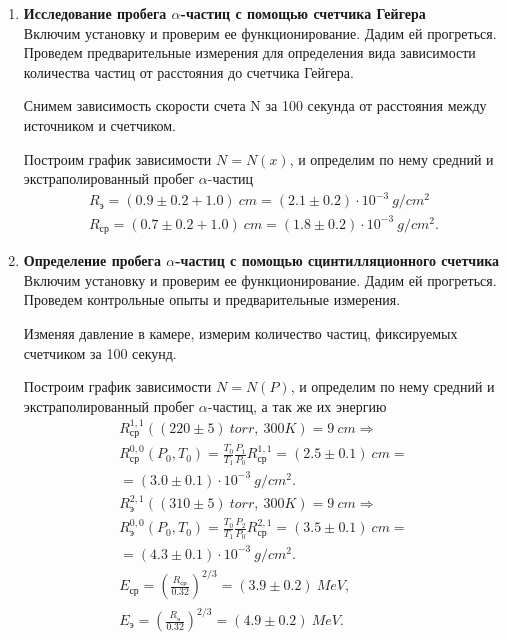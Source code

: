 \begin{enumerate}

\item 
\textbf{Исследование пробега $\alpha$-частиц с помощью счетчика Гейгера}\\
Включим установку и проверим ее функционирование. Дадим ей прогреться. Проведем предварительные измерения для определения вида зависимости количества частиц от расстояния до счетчика Гейгера.

Снимем зависимость скорости счета N за 100 секунда от расстояния между источником и счетчиком.

\begin{figure}[h]
\end{figure}

Построим график зависимости $N=N(x)$, и определим по нему средний и экстраполированный пробег $\alpha$-частиц
\begin{gather*}
R_{\text{э}} = (0.9 \pm 0.2 + 1.0)~cm = (2.1 \pm 0.2)\cdot10^{-3}~g/cm^2\\
R_{\text{ср}} = (0.7 \pm 0.2 + 1.0)~cm = (1.8 \pm 0.2)\cdot10^{-3}~g/cm^2.
\end{gather*}
\item
\textbf{Определение пробега $\alpha$-частиц с помощью сцинтилляционного счетчика}\\
Включим установку и проверим ее функционирование. Дадим ей прогреться. Проведем контрольные опыты и предварительные измерения.

Изменяя давление в камере, измерим количество частиц, фиксируемых счетчиком за 100 секунд.

\begin{figure}[h]
\end{figure}

Построим график зависимости $N=N(P)$, и определим по нему средний и экстраполированный пробег $\alpha$-частиц, а так же их энергию
\begin{gather*}
R_{\text{ср}}^{1, 1}((220 \pm 5)~torr,~300K) = 9~cm \Rightarrow\\
R_{\text{ср}}^{0, 0}(P_0, T_0) = \frac{T_0}{T_1} \frac{P_1}{P_0}R_{\text{ср}}^{1, 1} = (2.5 \pm 0.1)~cm =\\
= (3.0 \pm 0.1)\cdot10^{-3}~g/cm^2.\\
R_{\text{э}}^{2, 1}((310 \pm 5)~torr,~300K) = 9~cm \Rightarrow\\
R_{\text{э}}^{0, 0}(P_0, T_0) = \frac{T_0}{T_1} \frac{P_2}{P_0}R_{\text{ср}}^{2, 1} = (3.5 \pm 0.1)~cm =\\
= (4.3\pm0.1)\cdot10^{-3}~g/cm^2.\\
E_{\text{ср}} = \left( \frac{R_{\text{ср}}}{0.32} \right)^{2/3} = (3.9 \pm 0.2)~MeV, \\
E_{\text{э}} = \left( \frac{R_{\text{э}}}{0.32} \right)^{2/3} = (4.9 \pm 0.2)~MeV.
\end{gather*}


\end{enumerate}
